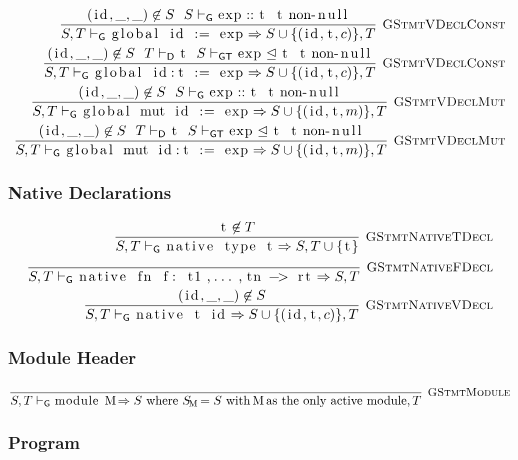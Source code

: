 \documentclass{article}
\newcommand{\code}[1]{\lstinline[columns=fixed]{#1}}
\newcommand{\drmrule}[5]{\frac{#1}{#2\vdash_{\mathsf{#3}}#4}\textsc{\ \small{#5}}}
\newcommand{\ruleapp}[1]{\vdash_{\mathsf{#1}}}
\newcommand{\mc}[1]{\textnormal{\code{#1}}}
\begin{document}
				\begin{align*}
					\drmrule{(\mc{id},\_,\_) \not\in S\ \ S\ruleapp{G}\mc{exp} :: \mc{t}\ \ \mc{t}\textnormal{ non-\code{null}}}{S,T}{G}{\mc{global id := exp} \Rightarrow S\cup\{(\mc{id},\mc{t},c)\},T}{GStmtVDeclConst}\\
					\drmrule{(\mc{id},\_,\_) \not\in S\ \ T\ruleapp{D}\mc{t}\ \ S\ruleapp{GT}\mc{exp}\trianglelefteq\mc{t}\ \ \mc{t}\textnormal{ non-\code{null}}}{S,T}{G}{\mc{global id:t := exp} \Rightarrow S\cup\{(\mc{id},\mc{t},c)\},T}{GStmtVDeclConst}\\
					\drmrule{(\mc{id},\_,\_) \not\in S\ \ S\ruleapp{G}\mc{exp} :: \mc{t}\ \ \mc{t}\textnormal{ non-\code{null}}}{S,T}{G}{\mc{global mut id := exp} \Rightarrow S\cup\{(\mc{id},\mc{t},m)\},T}{GStmtVDeclMut}\\
					\drmrule{(\mc{id},\_,\_) \not\in S\ \ T\ruleapp{D}\mc{t}\ \ S\ruleapp{GT}\mc{exp}\trianglelefteq\mc{t}\ \ \mc{t}\textnormal{ non-\code{null}}}{S,T}{G}{\mc{global mut id:t := exp} \Rightarrow S\cup\{(\mc{id},\mc{t},m)\},T}{GStmtVDeclMut}
				\end{align*}
				
			\subsubsection{Native Declarations}
			
				\begin{align*}
					\drmrule{\mc{t}\not\in T}{S,T}{G}{\mc{native type t} \Rightarrow S,T\cup\{\mc{t}\}}{GStmtNativeTDecl}\\
					\drmrule{}{S,T}{G}{\mc{native fn f: t1,...,tn -> rt} \Rightarrow S,T}{GStmtNativeFDecl}\\
					\drmrule{(\mc{id},\_,\_)\not\in S}{S,T}{G}{\mc{native t id} \Rightarrow S\cup\{(\mc{id},\mc{t},c)\},T}{GStmtNativeVDecl}
				\end{align*}
				
			\subsubsection{Module Header}
			
				\begin{align*}
					\drmrule{}{S,T}{G}{\mc{module M} \Rightarrow S \textnormal{ where $S_{\mc{M}} = S$ with \code{M} as the only active module},T}{GStmtModule}
				\end{align*}
			
			\subsubsection{Program}
			
\end{document}
